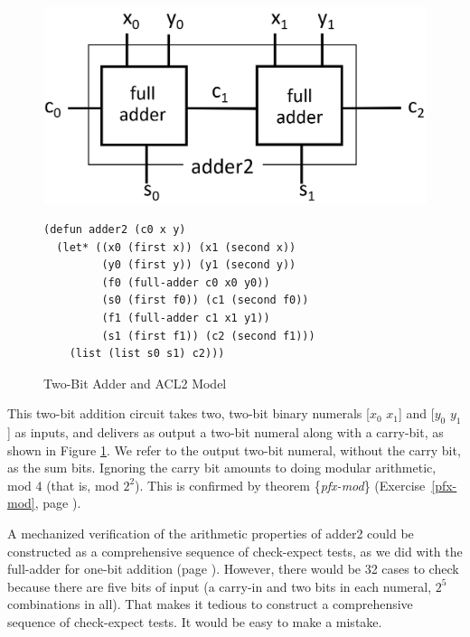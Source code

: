 \begin{figure}
\begin{center}
\includegraphics[scale=0.25]{Images/adder2.png}
\begin{Verbatim}
(defun adder2 (c0 x y)
  (let* ((x0 (first x)) (x1 (second x))
         (y0 (first y)) (y1 (second y))
         (f0 (full-adder c0 x0 y0))
         (s0 (first f0)) (c1 (second f0))
         (f1 (full-adder c1 x1 y1))
         (s1 (first f1)) (c2 (second f1)))
    (list (list s0 s1) c2)))
\end{Verbatim}
\end{center}
\caption{Two-Bit Adder and ACL2 Model}
\label{fig:adder2}
\end{figure}

This two-bit addition circuit takes two, two-bit binary numerals
[$x_0$ $x_1$] and [$y_0$ $y_1$] as inputs, and
delivers as output a two-bit numeral along with a carry-bit,
as shown in Figure \ref{fig:adder2}.
We refer to the output two-bit numeral, without the carry bit,
as the sum bits.
Ignoring the carry bit amounts to doing
modular arithmetic, mod 4 (that is, mod $2^2$).
This is confirmed by theorem \{\emph{pfx-mod}\}
(Exercise~\ref{pfx-mod}, page \pageref{pfx-mod}).

A mechanized verification of the arithmetic properties of adder2
could be constructed as a comprehensive sequence of check-expect tests,
as we did with the full-adder for one-bit addition
(page \pageref{full-adder-model-check}).
However, there would be 32 cases to check
because there are five bits of input
(a carry-in and two bits in each numeral, $2^5$ combinations in all).
That makes it tedious to construct a comprehensive sequence of check-expect tests.
It would be easy to make a mistake.


